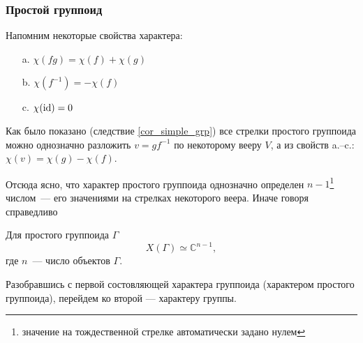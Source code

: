 \subsubsection{Простой группоид}
    Напомним некоторые свойства характера:
    \begin{itemize}
        \item[a.] $\chi(fg) = \chi(f) + \chi(g)$
        \item[b.] $\chi(f^{-1}) = - \chi(f)$
        \item[c.] $\chi(\operatorname*{id}) = 0$
    \end{itemize} 
    
    Как было показано (следствие \ref{cor_simple_grp}) все стрелки простого 
    группоида можно однозначно разложить $v = gf^{-1}$ по некоторому вееру $V$,
    а из свойств a.--c.: $\chi(v) = \chi(g) - \chi(f)$.

    Отсюда ясно, что характер простого группоида 
    однозначно определен $n-1$\footnote{значение на тождественной стрелке 
    автоматически задано нулем} числом~--- его значениями на стрелках некоторого 
    веера. Иначе говоря справедливо

    \begin{statement} Для простого группоида $\Gamma$
        \[X(\Gamma) \simeq \mathbb{C}^{n-1},\]
        где $n$~--- число объектов $\Gamma$.
    \end{statement}

    Разобравшись с первой состовляющей характера группоида (характером 
    простого группоида), перейдем ко второй --- характеру группы.